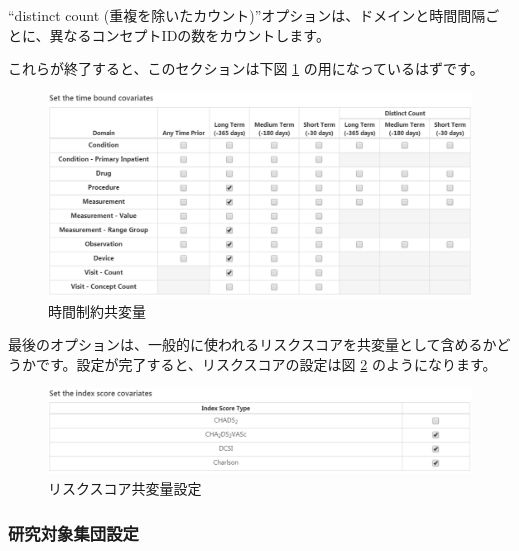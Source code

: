 \documentclass[
  11pt]{book}
\theoremstyle{definition}
\theoremstyle{definition}
\theoremstyle{definition}
\theoremstyle{definition}
\theoremstyle{remark}
\begin{document}
``distinct count (重複を除いたカウント)''オプションは、ドメインと時間間隔ごとに、異なるコンセプトIDの数をカウントします。

これらが終了すると、このセクションは下図 \ref{fig:covariateSettings5} の用になっているはずです。

\begin{figure}

{\centering \includegraphics[width=1\linewidth]{images/PatientLevelPrediction/covariateSettings5} 

}

\caption{時間制約共変量}\label{fig:covariateSettings5}
\end{figure}

最後のオプションは、一般的に使われるリスクスコアを共変量として含めるかどうかです。設定が完了すると、リスクスコアの設定は図 \ref{fig:covariateSettings6} のようになります。

\begin{figure}

{\centering \includegraphics[width=1\linewidth]{images/PatientLevelPrediction/covariateSettings6} 

}

\caption{リスクスコア共変量設定}\label{fig:covariateSettings6}
\end{figure}

\subsubsection*{研究対象集団設定}\label{ux7814ux7a76ux5bfeux8c61ux96c6ux56e3ux8a2dux5b9a}
\end{document}
